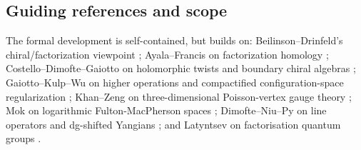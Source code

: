 \subsection*{Guiding references and scope}
The formal development is self-contained, but builds on: Beilinson--Drinfeld's chiral/factorization viewpoint \cite{BD04}; Ayala--Francis on factorization homology \cite{AF15}; Costello--Dimofte--Gaiotto on holomorphic twists and boundary chiral algebras \cite{CDG20}; Gaiotto--Kulp--Wu on higher operations and compactified configuration-space regularization \cite{GKW25}; Khan--Zeng on three-dimensional Poisson-vertex gauge theory \cite{KZ25}; Mok on logarithmic Fulton-MacPherson spaces \cite{Mok25}; Dimofte--Niu--Py on line operators and dg-shifted Yangians \cite{DNP25}; and Latyntsev on factorisation quantum groups \cite{Lat23}.

